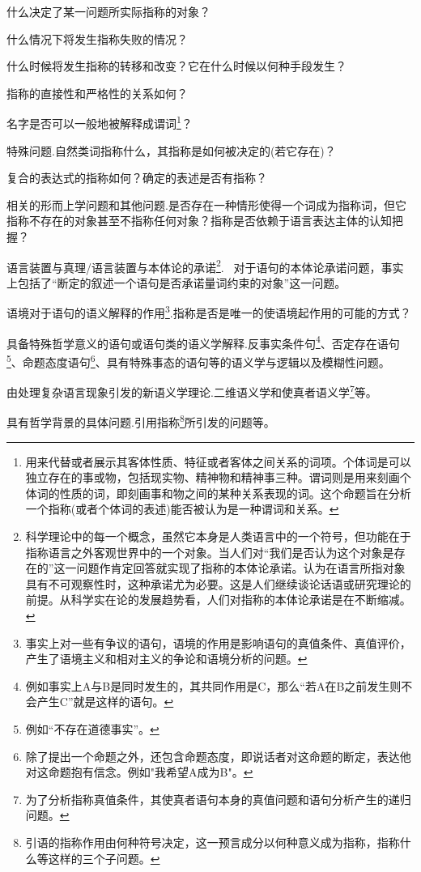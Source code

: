 \documentclass{article}
\begin{document}
什么决定了某一问题所实际指称的对象？

什么情况下将发生指称失败的情况？

什么时候将发生指称的转移和改变？它在什么时候以何种手段发生？

指称的直接性和严格性的关系如何？

名字是否可以一般地被解释成谓词\footnote{用来代替或者展示其客体性质、特征或者客体之间关系的词项。个体词是可以独立存在的事或物，包括现实物、精神物和精神事三种。谓词则是用来刻画个体词的性质的词，即刻画事和物之间的某种关系表现的词。这个命题旨在分析一个指称(或者个体词的表述)能否被认为是一种谓词和关系。}？

{\heiti 特殊问题.}自然类词指称什么，其指称是如何被决定的(若它存在)？

复合的表达式的指称如何？确定的表述是否有指称？

{\heiti 相关的形而上学问题和其他问题.}是否存在一种情形使得一个词成为指称词，但它指称不存在的对象甚至不指称任何对象？指称是否依赖于语言表达主体的认知把握？

{\heiti 语言装置与真理/语言装置与本体论的承诺\footnote{科学理论中的每一个概念，虽然它本身是人类语言中的一个符号，但功能在于指称语言之外客观世界中的一个对象。当人们对“我们是否认为这个对象是存在的”这一问题作肯定回答就实现了指称的本体论承诺。认为在语言所指对象具有不可观察性时，这种承诺尤为必要。这是人们继续谈论话语或研究理论的前提。从科学实在论的发展趋势看，人们对指称的本体论承诺是在不断缩减。}.} \ 对于语句的本体论承诺问题，事实上包括了“断定的叙述一个语句是否承诺量词约束的对象”这一问题。

{\heiti 语境对于语句的语义解释的作用\footnote{事实上对一些有争议的语句，语境的作用是影响语句的真值条件、真值评价，产生了语境主义和相对主义的争论和语境分析的问题。}.}指称是否是唯一的使语境起作用的可能的方式？

{\heiti 具备特殊哲学意义的语句或语句类的语义学解释.}反事实条件句\footnote{例如事实上A与B是同时发生的，其共同作用是C，那么“若A在B之前发生则不会产生C”就是这样的语句。}、否定存在语句\footnote{例如“不存在道德事实”。}、命题态度语句\footnote{除了提出一个命题之外，还包含命题态度，即说话者对这命题的断定，表达他对这命题抱有信念。例如"我希望A成为B"。}、具有特殊事态的语句等的语义学与逻辑以及模糊性问题。

{\heiti 由处理复杂语言现象引发的新语义学理论.}二维语义学和使真者语义学\footnote{为了分析指称真值条件，其使真者语句本身的真值问题和语句分析产生的递归问题。}等。

{\heiti 具有哲学背景的具体问题.}引用指称\footnote{引语的指称作用由何种符号决定，这一预言成分以何种意义成为指称，指称什么等这样的三个子问题。}所引发的问题等。
\end{document}
